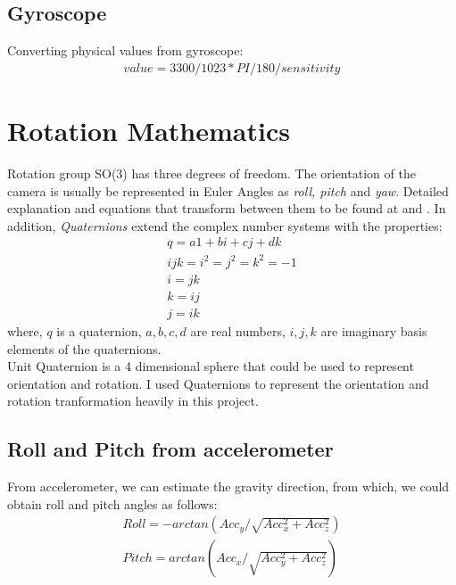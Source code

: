 \documentclass[english]{article}
\begin{document}
\subsection {Gyroscope} 
Converting physical values from gyroscope: \\
\begin{align}
value = 3300/1023 * PI/180 / sensitivity 
\end{align}

\section {Rotation Mathematics} 
Rotation group SO(3) has three degrees of freedom. The orientation of the camera is usually be represented in Euler Angles as \emph{roll, pitch} and \emph{yaw}. Detailed explanation and equations that transform between them to be found at \cite{Rotations} and \cite{3dtrans}. In addition, \emph{Quaternions} extend the complex number systems with the properties:
\begin{align}
q = a1 + bi + cj + dk \\
ijk = i^2 = j^2 = k^2 = -1 \\
i = jk \\
k = ij \\
j = ik 
\end{align}
where, $q$ is a quaternion, $a, b, c, d$ are real numbers, $i,j,k$ are imaginary basis elements of the quaternions.\\
Unit Quaternion is a 4 dimensional sphere that could be used to represent orientation and rotation. I used Quaternions to represent the orientation and rotation tranformation heavily in this project.

\subsection {Roll and Pitch from accelerometer}
From accelerometer, we can estimate the gravity direction, from which, we could obtain roll and pitch angles as follows:
\begin{align}
Roll = -arctan(Acc_y/ \sqrt{Acc_x^2 + Acc_z^2}) \\
Pitch = arctan(Acc_x/ \sqrt{Acc_y^2 + Acc_z^2})
\end{align}
\end{document}
